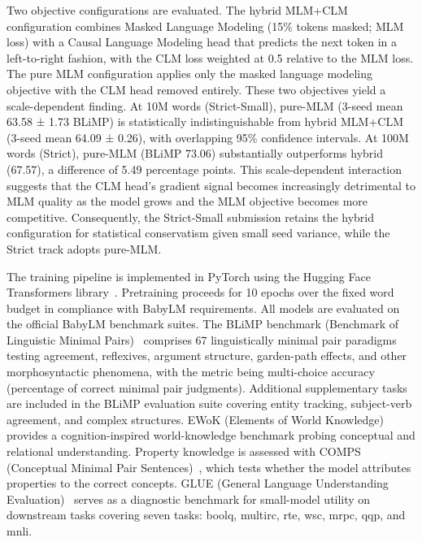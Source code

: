 
Two objective configurations are evaluated. The hybrid MLM+CLM configuration combines Masked Language Modeling (15\% tokens masked; MLM loss) with a Causal Language Modeling head that predicts the next token in a left-to-right fashion, with the CLM loss weighted at 0.5 relative to the MLM loss. The pure MLM configuration applies only the masked language modeling objective with the CLM head removed entirely. These two objectives yield a scale-dependent finding. At 10M words (Strict-Small), pure-MLM (3-seed mean 63.58 ± 1.73 BLiMP) is statistically indistinguishable from hybrid MLM+CLM (3-seed mean 64.09 ± 0.26), with overlapping 95\% confidence intervals. At 100M words (Strict), pure-MLM (BLiMP 73.06) substantially outperforms hybrid (67.57), a difference of 5.49 percentage points. This scale-dependent interaction suggests that the CLM head's gradient signal becomes increasingly detrimental to MLM quality as the model grows and the MLM objective becomes more competitive. Consequently, the Strict-Small submission retains the hybrid configuration for statistical conservatism given small seed variance, while the Strict track adopts pure-MLM.


The training pipeline is implemented in PyTorch using the Hugging Face Transformers library~\cite{Wolf2020Transformers}. Pretraining proceeds for 10 epochs over the fixed word budget in compliance with BabyLM requirements. All models are evaluated on the official BabyLM benchmark suites. The BLiMP benchmark (Benchmark of Linguistic Minimal Pairs)~\cite{Warstadt2020BLiMP} comprises 67 linguistically minimal pair paradigms testing agreement, reflexives, argument structure, garden-path effects, and other morphosyntactic phenomena, with the metric being multi-choice accuracy (percentage of correct minimal pair judgments). Additional supplementary tasks are included in the BLiMP evaluation suite covering entity tracking, subject-verb agreement, and complex structures. EWoK (Elements of World Knowledge)~\cite{Ivanova2024EWoK} provides a cognition-inspired world-knowledge benchmark probing conceptual and relational understanding. Property knowledge is assessed with COMPS (Conceptual Minimal Pair Sentences)~\cite{Misra2023COMPS}, which tests whether the model attributes properties to the correct concepts. GLUE (General Language Understanding Evaluation)~\cite{Wang2019GLUE} serves as a diagnostic benchmark for small-model utility on downstream tasks covering seven tasks: boolq, multirc, rte, wsc, mrpc, qqp, and mnli.


